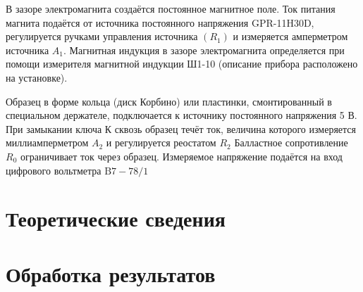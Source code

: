 \documentclass[a4paper, 12pt]{article}
\begin{document}
В зазоре электромагнита создаётся постоянное магнитное поле. Ток питания магнита подаётся от источника постоянного напряжения GPR-11H30D, регулируется ручками управления источника $\left(R_{1}\right)$ и измеряется амперметром источника $A_{1}$. Магнитная индукция в зазоре электромагнита определяется при помощи измерителя магнитной индукции Ш1-10 (описание прибора расположено на установке).

Образец в форме кольца (диск Корбино) или пластинки, смонтированный в специальном держателе, подключается к источнику постоянного напряжения 5 В. При замыкании ключа К сквозь образец течёт ток, величина которого измеряется миллиамперметром $A_{2}$ и регулируется реостатом $R_{2}$ Балластное сопротивление $R_{0}$ ограничивает ток через образец. Измеряемое напряжение подаётся на вход цифрового вольтметра $\mathrm{B} 7-78 / 1$

\section{Теоретические сведения}
\section{Обработка результатов}
\end{document}

